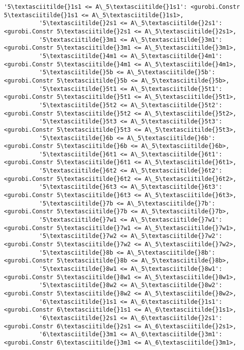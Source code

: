 \documentclass[11pt]{article}
\begin{document}
\begin{Verbatim}[commandchars=\\\{\}]
          '5\textasciitilde{}1s1 <= A\_5\textasciitilde{}1s1': <gurobi.Constr 5\textasciitilde{}1s1 <= A\_5\textasciitilde{}1s1>,
          '5\textasciitilde{}2s1 <= A\_5\textasciitilde{}2s1': <gurobi.Constr 5\textasciitilde{}2s1 <= A\_5\textasciitilde{}2s1>,
          '5\textasciitilde{}3m1 <= A\_5\textasciitilde{}3m1': <gurobi.Constr 5\textasciitilde{}3m1 <= A\_5\textasciitilde{}3m1>,
          '5\textasciitilde{}4m1 <= A\_5\textasciitilde{}4m1': <gurobi.Constr 5\textasciitilde{}4m1 <= A\_5\textasciitilde{}4m1>,
          '5\textasciitilde{}5b <= A\_5\textasciitilde{}5b': <gurobi.Constr 5\textasciitilde{}5b <= A\_5\textasciitilde{}5b>,
          '5\textasciitilde{}5t1 <= A\_5\textasciitilde{}5t1': <gurobi.Constr 5\textasciitilde{}5t1 <= A\_5\textasciitilde{}5t1>,
          '5\textasciitilde{}5t2 <= A\_5\textasciitilde{}5t2': <gurobi.Constr 5\textasciitilde{}5t2 <= A\_5\textasciitilde{}5t2>,
          '5\textasciitilde{}5t3 <= A\_5\textasciitilde{}5t3': <gurobi.Constr 5\textasciitilde{}5t3 <= A\_5\textasciitilde{}5t3>,
          '5\textasciitilde{}6b <= A\_5\textasciitilde{}6b': <gurobi.Constr 5\textasciitilde{}6b <= A\_5\textasciitilde{}6b>,
          '5\textasciitilde{}6t1 <= A\_5\textasciitilde{}6t1': <gurobi.Constr 5\textasciitilde{}6t1 <= A\_5\textasciitilde{}6t1>,
          '5\textasciitilde{}6t2 <= A\_5\textasciitilde{}6t2': <gurobi.Constr 5\textasciitilde{}6t2 <= A\_5\textasciitilde{}6t2>,
          '5\textasciitilde{}6t3 <= A\_5\textasciitilde{}6t3': <gurobi.Constr 5\textasciitilde{}6t3 <= A\_5\textasciitilde{}6t3>,
          '5\textasciitilde{}7b <= A\_5\textasciitilde{}7b': <gurobi.Constr 5\textasciitilde{}7b <= A\_5\textasciitilde{}7b>,
          '5\textasciitilde{}7w1 <= A\_5\textasciitilde{}7w1': <gurobi.Constr 5\textasciitilde{}7w1 <= A\_5\textasciitilde{}7w1>,
          '5\textasciitilde{}7w2 <= A\_5\textasciitilde{}7w2': <gurobi.Constr 5\textasciitilde{}7w2 <= A\_5\textasciitilde{}7w2>,
          '5\textasciitilde{}8b <= A\_5\textasciitilde{}8b': <gurobi.Constr 5\textasciitilde{}8b <= A\_5\textasciitilde{}8b>,
          '5\textasciitilde{}8w1 <= A\_5\textasciitilde{}8w1': <gurobi.Constr 5\textasciitilde{}8w1 <= A\_5\textasciitilde{}8w1>,
          '5\textasciitilde{}8w2 <= A\_5\textasciitilde{}8w2': <gurobi.Constr 5\textasciitilde{}8w2 <= A\_5\textasciitilde{}8w2>,
          '6\textasciitilde{}1s1 <= A\_6\textasciitilde{}1s1': <gurobi.Constr 6\textasciitilde{}1s1 <= A\_6\textasciitilde{}1s1>,
          '6\textasciitilde{}2s1 <= A\_6\textasciitilde{}2s1': <gurobi.Constr 6\textasciitilde{}2s1 <= A\_6\textasciitilde{}2s1>,
          '6\textasciitilde{}3m1 <= A\_6\textasciitilde{}3m1': <gurobi.Constr 6\textasciitilde{}3m1 <= A\_6\textasciitilde{}3m1>,

\end{Verbatim}
\end{document}

